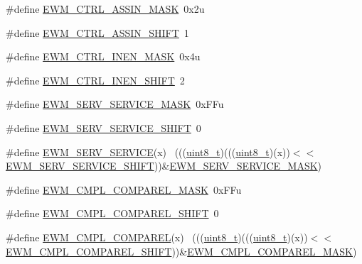 \begin{DoxyCompactItemize}
\item 
\#define \hyperlink{group___e_w_m___register___masks_ga24fe6289cbd9e813f99fb721d28b7bb5}{E\+W\+M\+\_\+\+C\+T\+R\+L\+\_\+\+A\+S\+S\+I\+N\+\_\+\+M\+A\+SK}~0x2u
\item 
\#define \hyperlink{group___e_w_m___register___masks_gac397960fb320e62f5c89e057e9f5ce13}{E\+W\+M\+\_\+\+C\+T\+R\+L\+\_\+\+A\+S\+S\+I\+N\+\_\+\+S\+H\+I\+FT}~1
\item 
\#define \hyperlink{group___e_w_m___register___masks_ga4366a1e4b346e8a61898588faa0ca7df}{E\+W\+M\+\_\+\+C\+T\+R\+L\+\_\+\+I\+N\+E\+N\+\_\+\+M\+A\+SK}~0x4u
\item 
\#define \hyperlink{group___e_w_m___register___masks_ga64cbcf45aac428b81d2ed6aab3cd0fe2}{E\+W\+M\+\_\+\+C\+T\+R\+L\+\_\+\+I\+N\+E\+N\+\_\+\+S\+H\+I\+FT}~2
\item 
\#define \hyperlink{group___e_w_m___register___masks_ga45e5d6d64deeb807800e044bb82f318f}{E\+W\+M\+\_\+\+S\+E\+R\+V\+\_\+\+S\+E\+R\+V\+I\+C\+E\+\_\+\+M\+A\+SK}~0x\+F\+Fu
\item 
\#define \hyperlink{group___e_w_m___register___masks_ga4aacdb92f0d1a2edcdf651328e741c6a}{E\+W\+M\+\_\+\+S\+E\+R\+V\+\_\+\+S\+E\+R\+V\+I\+C\+E\+\_\+\+S\+H\+I\+FT}~0
\item 
\#define \hyperlink{group___e_w_m___register___masks_gaf5f891da276df3d0ec104c6aa126540e}{E\+W\+M\+\_\+\+S\+E\+R\+V\+\_\+\+S\+E\+R\+V\+I\+CE}(x)                                        ~(((\hyperlink{_p_e___types_8h_aba7bc1797add20fe3efdf37ced1182c5}{uint8\+\_\+t})(((\hyperlink{_p_e___types_8h_aba7bc1797add20fe3efdf37ced1182c5}{uint8\+\_\+t})(x))$<$$<$\hyperlink{group___e_w_m___register___masks_ga4aacdb92f0d1a2edcdf651328e741c6a}{E\+W\+M\+\_\+\+S\+E\+R\+V\+\_\+\+S\+E\+R\+V\+I\+C\+E\+\_\+\+S\+H\+I\+FT}))\&\hyperlink{group___e_w_m___register___masks_ga45e5d6d64deeb807800e044bb82f318f}{E\+W\+M\+\_\+\+S\+E\+R\+V\+\_\+\+S\+E\+R\+V\+I\+C\+E\+\_\+\+M\+A\+SK})
\item 
\#define \hyperlink{group___e_w_m___register___masks_gaed4764277fd6da7338abe074b6ca509e}{E\+W\+M\+\_\+\+C\+M\+P\+L\+\_\+\+C\+O\+M\+P\+A\+R\+E\+L\+\_\+\+M\+A\+SK}~0x\+F\+Fu
\item 
\#define \hyperlink{group___e_w_m___register___masks_ga34ba2acd3dfb6ac825d6ca812b4461fd}{E\+W\+M\+\_\+\+C\+M\+P\+L\+\_\+\+C\+O\+M\+P\+A\+R\+E\+L\+\_\+\+S\+H\+I\+FT}~0
\item 
\#define \hyperlink{group___e_w_m___register___masks_ga227fbc36660dcf0e564dd4496832155c}{E\+W\+M\+\_\+\+C\+M\+P\+L\+\_\+\+C\+O\+M\+P\+A\+R\+EL}(x)                                      ~(((\hyperlink{_p_e___types_8h_aba7bc1797add20fe3efdf37ced1182c5}{uint8\+\_\+t})(((\hyperlink{_p_e___types_8h_aba7bc1797add20fe3efdf37ced1182c5}{uint8\+\_\+t})(x))$<$$<$\hyperlink{group___e_w_m___register___masks_ga34ba2acd3dfb6ac825d6ca812b4461fd}{E\+W\+M\+\_\+\+C\+M\+P\+L\+\_\+\+C\+O\+M\+P\+A\+R\+E\+L\+\_\+\+S\+H\+I\+FT}))\&\hyperlink{group___e_w_m___register___masks_gaed4764277fd6da7338abe074b6ca509e}{E\+W\+M\+\_\+\+C\+M\+P\+L\+\_\+\+C\+O\+M\+P\+A\+R\+E\+L\+\_\+\+M\+A\+SK})

\end{DoxyCompactItemize}

